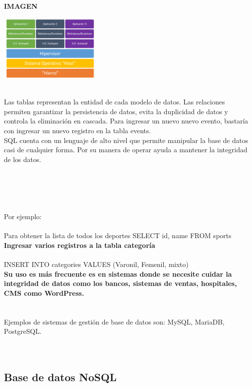 \documentclass[twoside,twocolumn]{article}
\begin{document}
\begin{flushright}
\begin{itemize}
\textbf{IMAGEN}\\
\begin{center}
	\includegraphics[width=5cm]{./Imagenes/virtualizacion} 
	\end{center}
\textbf{}\\
Las tablas representan la entidad de cada modelo de datos. Las relaciones permiten garantizar la persistencia de datos, evita la duplicidad de datos y controla la eliminación en cascada. Para ingresar un nuevo nuevo evento, bastaría con ingresar un nuevo registro en la tabla events.\textbf{}\\
SQL cuenta con un lenguaje de alto nivel que permite manipular la base de datos casi de cualquier forma. Por su manera de operar ayuda a mantener la integridad de los datos.
\textbf{}\\
\textbf{}\\
\textbf{}\\
\textbf{}\\
\textbf{}\\
\textbf{}\\
 Por ejemplo:
\textbf{}\\
\textbf{}\\
Para obtener la lista de todos los deportes
SELECT id, name FROM sports
\textbf{}\\
\textbf{Ingresar varios registros a la tabla categoría}\\
\textbf{}\\
INSERT INTO categories VALUES (Varonil, Femenil, mixto)
\textbf{}\\
\textbf{Su uso es más frecuente es en sistemas donde se necesite cuidar la integridad de datos como los bancos, sistemas de ventas, hospitales, CMS como WordPress.}\\
\textbf{}\\
\textbf{}\\
Ejemplos de sistemas de gestión de base de datos son: MySQL, MariaDB, PostgreSQL.\textbf{}\\

 \textbf{}\\
\textbf{}\\


\subsection{Base de datos NoSQL}


\end{itemize}
\end{flushright}
\end{document}
